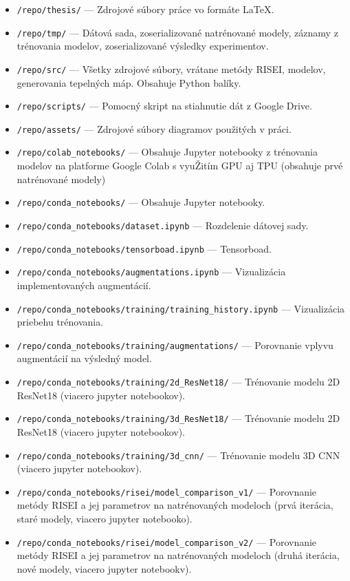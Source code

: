 \begin{itemize}
    \item \texttt{/repo/thesis/} --- Zdrojové súbory práce vo formáte \LaTeX.
    \item \texttt{/repo/tmp/} --- Dátová sada, zoserializované natrénované modely, záznamy z trénovania modelov, zoserializované výsledky experimentov. 
    \item \texttt{/repo/src/} --- Všetky zdrojové súbory, vrátane metódy RISEI, modelov, generovania tepelných máp. Obsahuje Python balíky.
    \item \texttt{/repo/scripts/} --- Pomocný skript na stiahnutie dát z Google Drive.
    \item \texttt{/repo/assets/} --- Zdrojové súbory diagramov použitých v práci. 
    \item \texttt{/repo/colab\_notebooks/} --- Obsahuje Jupyter notebooky z trénovania modelov na platforme Google Colab s vyuŽitím GPU aj TPU (obsahuje prvé natrénované modely) 
    \item \texttt{/repo/conda\_notebooks/} --- Obsahuje Jupyter notebooky.
    \item \texttt{/repo/conda\_notebooks/dataset.ipynb} --- Rozdelenie dátovej sady.
    \item \texttt{/repo/conda\_notebooks/tensorboad.ipynb} --- Tensorboad.
    \item \texttt{/repo/conda\_notebooks/augmentations.ipynb} --- Vizualizácia implementovaných augmentácií.
    \item \texttt{/repo/conda\_notebooks/training/training\_history.ipynb} --- Vizualizácia priebehu trénovania.
    \item \texttt{/repo/conda\_notebooks/training/augmentations/} --- Porovnanie vplyvu augmentácií na výsledný model. 
    \item \texttt{/repo/conda\_notebooks/training/2d\_ResNet18/} --- Trénovanie modelu 2D ResNet18 (viacero jupyter notebookov).
    \item \texttt{/repo/conda\_notebooks/training/3d\_ResNet18/} --- Trénovanie modelu 2D ResNet18 (viacero jupyter notebookov).
    \item \texttt{/repo/conda\_notebooks/training/3d\_cnn/} --- Trénovanie modelu 3D CNN (viacero jupyter notebookov).
    \item \texttt{/repo/conda\_notebooks/risei/model\_comparison\_v1/} --- Porovnanie metódy RISEI a jej parametrov na natrénovaných modeloch (prvá iterácia, staré modely, viacero jupyter notebooko).
    \item \texttt{/repo/conda\_notebooks/risei/model\_comparison\_v2/} --- Porovnanie metódy RISEI a jej parametrov na natrénovaných modeloch (druhá iterácia, nové modely, viacero jupyter notebookv).

\end{itemize}
